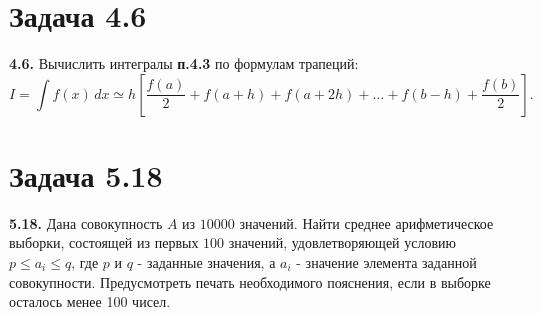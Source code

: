 \documentclass[a4paper,12pt]{article}
\begin{document}
\section* {\large Задача 4.6}
\textbf{4.6.} Вычислить интегралы \textbf{п.4.3} по формулам трапеций:
\begin{displaymath}
I=\int f(x)\,dx \simeq h
\left[
  \frac{f(a)}{2}+f(a+h)+f(a+2h)+\ldots+f(b-h)+\frac{f(b)}{2}
\right].
\end{displaymath}

\section* {\large Задача 5.18}
\textbf{5.18.} Дана совокупность $A$ из $10000$ значений. Найти
среднее арифметическое выборки, состоящей из первых $100$ значений,
удовлетворяющей условию $p\le a_i \le q$, где $p$ и $q$ - заданные
значения, а $a_i$ - значение элемента заданной
совокупности. Предусмотреть печать необходимого пояснения, если в
выборке осталось менее 100 чисел.
\end{document}
